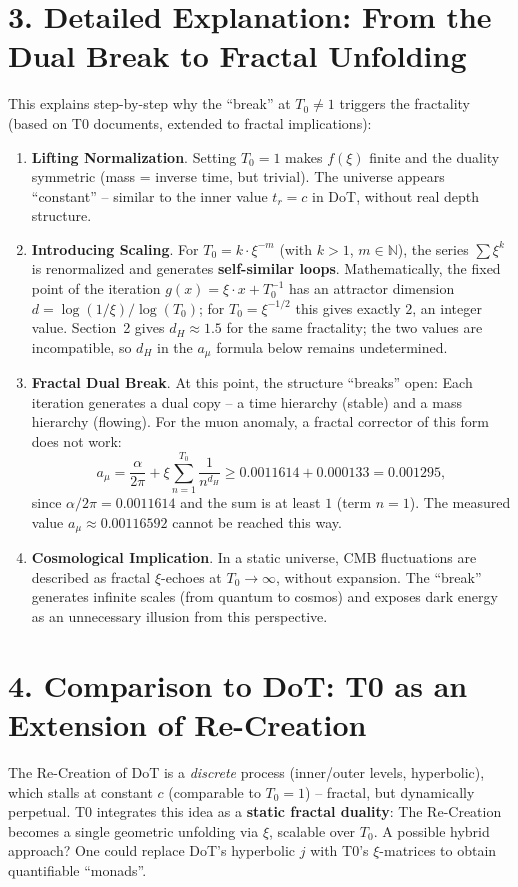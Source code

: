 	\section*{3. Detailed Explanation: From the Dual Break to Fractal Unfolding}
	This explains step-by-step why the ``break'' at \( T_0 \neq 1 \) triggers the fractality (based on T0 documents, extended to fractal implications):
	\begin{enumerate}[label=\textbf{Step \arabic*:}, leftmargin=*]
		\item \textbf{Lifting Normalization}. Setting \( T_0 = 1 \) makes \( f(\xi) \) finite and the duality symmetric (mass = inverse time, but trivial). The universe appears ``constant'' – similar to the inner value \( t_r = c \) in DoT, without real depth structure.
		\item \textbf{Introducing Scaling}. For \( T_0 = k \cdot \xi^{-m} \) (with \( k > 1 \), \( m \in \mathbb{N} \)), the series \( \sum \xi^k \) is renormalized and generates \textbf{self-similar loops}. Mathematically, the fixed point of the iteration \( g(x) = \xi \cdot x + T_0^{-1} \) has an attractor dimension \( d = \log(1/\xi) / \log(T_0) \); for \( T_0 = \xi^{-1/2} \) this gives exactly \( 2 \), an integer value. Section~2 gives \( d_H \approx 1.5 \) for the same fractality; the two values are incompatible, so \( d_H \) in the \( a_\mu \) formula below remains undetermined.
		\item \textbf{Fractal Dual Break}. At this point, the structure ``breaks'' open: Each iteration generates a dual copy – a time hierarchy (stable) and a mass hierarchy (flowing). For the muon anomaly, a fractal corrector of this form does not work:
		\[
		a_\mu = \frac{\alpha}{2\pi} + \xi \sum_{n=1}^{T_0} \frac{1}{n^{d_H}} \geq 0.0011614 + 0.000133 = 0.001295,
		\]
		since \( \alpha/2\pi = 0.0011614 \) and the sum is at least \( 1 \) (term \( n=1 \)). The measured value \( a_\mu \approx 0.00116592 \) cannot be reached this way.
		\item \textbf{Cosmological Implication}. In a static universe, CMB fluctuations are described as fractal \( \xi \)-echoes at \( T_0 \to \infty \), without expansion. The ``break'' generates infinite scales (from quantum to cosmos) and exposes dark energy as an unnecessary illusion from this perspective.
	\end{enumerate}
	
	\section*{4. Comparison to DoT: T0 as an Extension of Re-Creation}
	The Re-Creation of DoT is a \emph{discrete} process (inner/outer levels, hyperbolic), which stalls at constant \( c \) (comparable to \( T_0 = 1 \)) – fractal, but dynamically perpetual. T0 integrates this idea as a \textbf{static fractal duality}: The Re-Creation becomes a single geometric unfolding via \( \xi \), scalable over \( T_0 \). A possible hybrid approach? One could replace DoT's hyperbolic \( j \) with T0's \( \xi \)-matrices to obtain quantifiable ``monads''.
	
